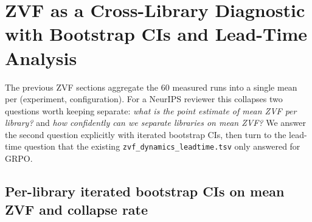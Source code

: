 %
%
%
%
%

\section{ZVF as a Cross-Library Diagnostic with Bootstrap CIs and Lead-Time Analysis}
\label{sec:zvf-iter22}

The previous ZVF sections aggregate the 60 measured runs into a single
mean per (experiment, configuration). For a NeurIPS reviewer this
collapses two questions worth keeping separate: \emph{what is the
point estimate of mean ZVF per library?} and \emph{how confidently can
we separate libraries on mean ZVF?} We answer the second question
explicitly with iterated bootstrap CIs, then turn to the lead-time
question that the existing \texttt{zvf\_dynamics\_leadtime.tsv} only
answered for GRPO.

\subsection{Per-library iterated bootstrap CIs on mean ZVF and collapse rate}
\label{sec:zvf-iter22-bs}

